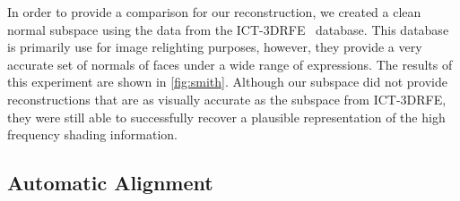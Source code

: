 In order to provide a comparison for our reconstruction, we created a clean
normal subspace using the data from the ICT-3DRFE~\cite{stratou2012exploring}
database. This database is primarily use for image relighting purposes, however,
they provide a very accurate set of normals of faces under a wide range of
expressions. The results of this experiment are shown in \cref{fig:smith}.
Although our subspace did not provide reconstructions that are as visually
accurate as the subspace from ICT-3DRFE, they were still able to successfully
recover a plausible representation of the high frequency shading information.
\subsection{Automatic Alignment}\label{subsec:experiments_alignment}
\newcommand{\tomhanksalignment}[1]
{
\texttt{[image: images/tom\_hanks/tom\_hanks\_improve\_\#1\_initial]} &
\texttt{[image: images/tom\_hanks/tom\_hanks\_improve\_\#1\_final]}   & \hspace{0.3cm}
\texttt{[image: images/tom\_hanks/tom\_hanks\_improve\_\#1\_depth]}
}
